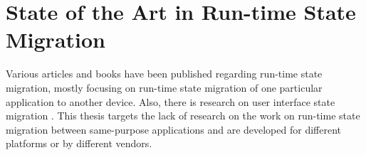\chapter{State of the Art in Run-time State Migration}
\label{ch:state_of_art}

Various articles and books have been published regarding run-time state migration, mostly focusing on run-time state migration of one particular application to another device. Also, there is research on user interface state migration  \cite{migratory-interactive}. This thesis targets the lack of research on the work on run-time state migration between same-purpose applications and are developed for different platforms or by different vendors. 